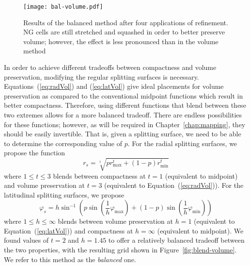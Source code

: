 \begin{figure}[ht!]
	\centering
	\texttt{[image: bal-volume.pdf]}
	\caption[Visualization of cell volumes in the balanced modification]{
		Results of the balanced method after four applications of refinement.
		NG cells are still stretched and squashed in order to better preserve volume; however, the effect is less pronounced than in the volume method
	}
	\label{fig:balanced-volume}
\end{figure}


In order to achieve different tradeoffs between compactness and volume preservation, modifying the regular splitting surfaces is necessary.
Equations~(\ref{eq:radVol}) and (\ref{eq:latVol}) give ideal placements for volume preservation as compared to the conventional midpoint functions which result in better compactness.
Therefore, using different functions that blend between these two extremes allows for a more balanced tradeoff.
There are endless possibilities for these functions; however, as will be required in Chapter~\ref{chap:mapping}, they should be easily invertible.
That is, given a splitting surface, we need to be able to determine the corresponding value of $p$.
For the radial splitting surfaces, we propose the function
%
\begin{equation*}
r_{s} = \sqrt[t]{ p r_\mathrm{max}^{t} + \left( 1 - p \right) r_\mathrm{min}^{t} }
\end{equation*}
%
where $1 \leq t \leq 3$ blends between compactness at $t = 1$ (equivalent to midpoint) and volume preservation at $t=3$ (equivalent to Equation~(\ref{eq:radVol})).
For the latitudinal splitting surfaces, we propose
%
\begin{equation*}
\varphi_{s} = h \sin^{-1} \left( p \sin \left( \frac{1}{h} \varphi_\mathrm{max} \right) + \left( 1 - p \right) \sin \left( \frac{1}{h} \varphi_\mathrm{min} \right) \right)
\end{equation*}
%
where $1 \leq h \leq \infty$ blends between volume preservation at $h = 1$ (equivalent to Equation~(\ref{eq:latVol})) and compactness at $h = \infty$ (equivalent to midpoint). We found values of $t = 2$ and $h = 1.45$ to offer a relatively balanced tradeoff between the two properties, with the resulting grid shown in Figure~\ref{fig:blend-volume}.
We refer to this method as the \textit{balanced} one.


